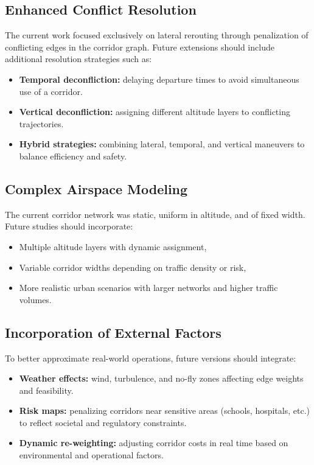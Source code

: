\subsection*{Enhanced Conflict Resolution}
The current work focused exclusively on lateral rerouting through penalization
of conflicting edges in the corridor graph. Future extensions should include
additional resolution strategies such as:
\begin{itemize}
    \item \textbf{Temporal deconfliction:} delaying departure times to avoid
    simultaneous use of a corridor.
    \item \textbf{Vertical deconfliction:} assigning different altitude layers
    to conflicting trajectories.
    \item \textbf{Hybrid strategies:} combining lateral, temporal, and vertical
    maneuvers to balance efficiency and safety.
\end{itemize}

\subsection*{Complex Airspace Modeling}
The current corridor network was static, uniform in altitude, and of fixed
width. Future studies should incorporate:
\begin{itemize}
    \item Multiple altitude layers with dynamic assignment,
    \item Variable corridor widths depending on traffic density or risk,
    \item More realistic urban scenarios with larger networks and higher traffic
    volumes.
\end{itemize}

\subsection*{Incorporation of External Factors}
To better approximate real-world operations, future versions should integrate:
\begin{itemize}
    \item \textbf{Weather effects:} wind, turbulence, and no-fly zones affecting
    edge weights and feasibility.
    \item \textbf{Risk maps:} penalizing corridors near sensitive areas (schools,
    hospitals, etc.) to reflect societal and regulatory constraints.
    \item \textbf{Dynamic re-weighting:} adjusting corridor costs in real time
    based on environmental and operational factors.
\end{itemize}


